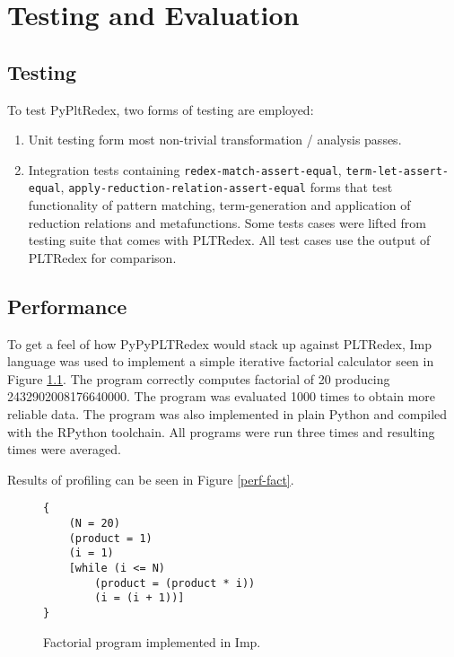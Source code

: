 \chapter{Testing and Evaluation}

\section{Testing}

To test PyPltRedex, two forms of testing are employed: 

\begin{enumerate}
\item Unit testing form most non-trivial transformation / analysis passes.
\item Integration tests containing \texttt{redex-match-assert-equal}, \texttt{term-let-assert-equal}, \texttt{apply-reduction-relation-assert-equal} forms that test functionality of pattern matching, term-generation and application of reduction relations and metafunctions. Some tests cases were lifted from testing suite that comes with PLTRedex. All test cases use the output of PLTRedex for comparison.
\end{enumerate}

\section{Performance}

To get a feel of how PyPyPLTRedex would stack up against PLTRedex, Imp language was used to implement a simple iterative factorial calculator seen in Figure \ref{imp-factorial}. The program correctly computes factorial of 20 producing 2432902008176640000.  The program was evaluated 1000 times to obtain more reliable data. The program was also implemented in plain Python and compiled with the RPython toolchain. All programs were run three times and resulting times were averaged. 

Results of profiling can be seen in Figure \ref{perf-fact}.

\begin{figure}[h]
\begin{verbatim}
{
	(N = 20)
	(product = 1)
	(i = 1)
	[while (i <= N)
		(product = (product * i))
		(i = (i + 1))]
}
\end{verbatim}
\caption{Factorial program implemented in Imp.}
\label{imp-factorial}
\end{figure}

